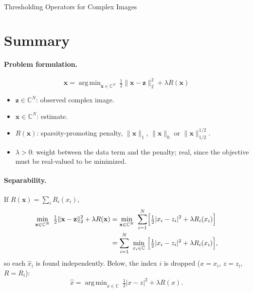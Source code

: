 \documentclass[11pt,a4paper]{article}
\theoremstyle{definition}
\newcommand{\C}{\mathbb{C}}
\DeclareMathOperator*{\argmin}{arg\,min}
\begin{document}
\begin{center}
{\LARGE Thresholding Operators for Complex Images}
\end{center}

\section{Summary}\label{sec:summary}

\paragraph{Problem formulation.}
\[
  \hat{\mathbf x} = \argmin_{\mathbf x\in\C^N}\ \tfrac12\lVert \mathbf x - \mathbf z\rVert_2^2 + \lambda R(\mathbf x)
\]
\begin{itemize}
  \item $\mathbf z\in\C^N$: observed complex image.
  \item $\mathbf x\in\C^N$: estimate.
  \item $R(\mathbf x)$: sparsity-promoting penalty, $\lVert\mathbf x\rVert_1$, $\lVert\mathbf x\rVert_0$ or $\lVert\mathbf x\rVert_{1/2}^{1/2}$.
  \item $\lambda>0$: weight between the data term and the penalty; real, since the objective must be
        real-valued to be minimized.
\end{itemize}

\paragraph{Separability.} If $R(\mathbf x) = \sum_i R_i(x_i)$,
\begin{align*}
  \min_{\mathbf x\in\C^N}\ \tfrac12\lVert \mathbf x - \mathbf z\rVert_2^2 + \lambda R(\mathbf x)
  &= \min_{\mathbf x\in\C^N}\ \sum_{i=1}^N \Bigl[\tfrac12|x_i - z_i|^2 + \lambda R_i(x_i)\Bigr] \\
  &= \sum_{i=1}^N\ \min_{x_i\in\C}\ \Bigl[\tfrac12|x_i - z_i|^2 + \lambda R_i(x_i)\Bigr],
\end{align*}
so each $\hat x_i$ is found independently. Below, the index $i$ is dropped ($x=x_i$, $z=z_i$, $R=R_i$):
\[
  \hat x = \argmin_{x\in\C}\ \tfrac12|x-z|^2 + \lambda R(x).
\]
\end{document}
